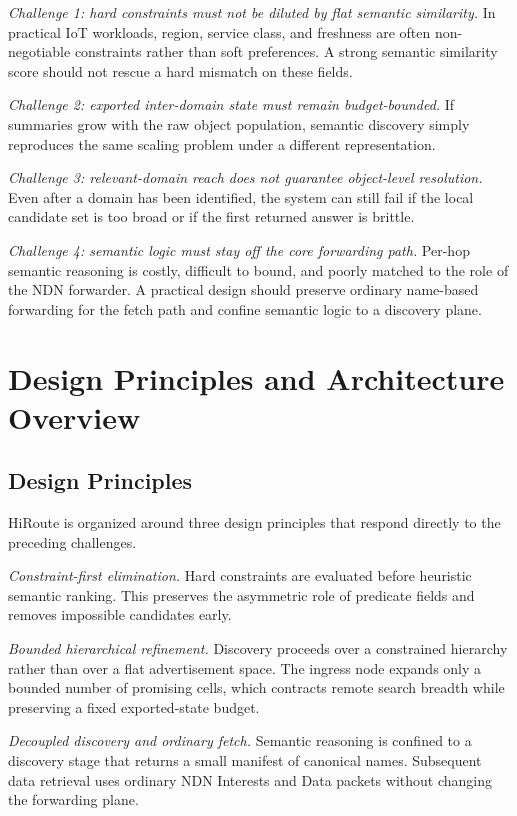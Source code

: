 \documentclass[journal]{IEEEtran}
\newcommand{\sysname}{HiRoute}
\begin{document}
\emph{Challenge 1: hard constraints must not be diluted by flat semantic similarity.} In practical IoT workloads, region, service class, and freshness are often non-negotiable constraints rather than soft preferences. A strong semantic similarity score should not rescue a hard mismatch on these fields.

\emph{Challenge 2: exported inter-domain state must remain budget-bounded.} If summaries grow with the raw object population, semantic discovery simply reproduces the same scaling problem under a different representation.

\emph{Challenge 3: relevant-domain reach does not guarantee object-level resolution.} Even after a domain has been identified, the system can still fail if the local candidate set is too broad or if the first returned answer is brittle.

\emph{Challenge 4: semantic logic must stay off the core forwarding path.} Per-hop semantic reasoning is costly, difficult to bound, and poorly matched to the role of the NDN forwarder. A practical design should preserve ordinary name-based forwarding for the fetch path and confine semantic logic to a discovery plane.

\section{Design Principles and Architecture Overview}

\subsection{Design Principles}

\sysname{} is organized around three design principles that respond directly to the preceding challenges.

\emph{Constraint-first elimination.} Hard constraints are evaluated before heuristic semantic ranking. This preserves the asymmetric role of predicate fields and removes impossible candidates early.

\emph{Bounded hierarchical refinement.} Discovery proceeds over a constrained hierarchy rather than over a flat advertisement space. The ingress node expands only a bounded number of promising cells, which contracts remote search breadth while preserving a fixed exported-state budget.

\emph{Decoupled discovery and ordinary fetch.} Semantic reasoning is confined to a discovery stage that returns a small manifest of canonical names. Subsequent data retrieval uses ordinary NDN Interests and Data packets without changing the forwarding plane.
\end{document}
